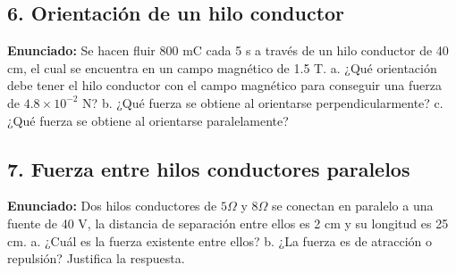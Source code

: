 \documentclass[12pt, letterpaper]{article}
\begin{document}
\subsection*{6. Orientación de un hilo conductor}
\noindent \textbf{Enunciado:} Se hacen fluir 800 mC cada 5 s a través de un hilo conductor de 40 cm, el cual se encuentra en un campo magnético de 1.5 T. a. ¿Qué orientación debe tener el hilo conductor con el campo magnético para conseguir una fuerza de $4.8 \times 10^{-2} \text{ N}$? b. ¿Qué fuerza se obtiene al orientarse perpendicularmente? c. ¿Qué fuerza se obtiene al orientarse paralelamente? %


\subsection*{7. Fuerza entre hilos conductores paralelos}
\noindent \textbf{Enunciado:} Dos hilos conductores de $5 \Omega$ y $8 \Omega$ se conectan en paralelo a una fuente de 40 V, la distancia de separación entre ellos es 2 cm y su longitud es 25 cm. a. ¿Cuál es la fuerza existente entre ellos? b. ¿La fuerza es de atracción o repulsión? Justifica la respuesta. %
\end{document}
